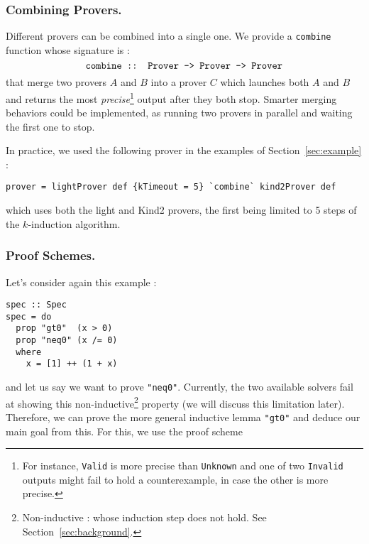 %


\subsubsection{Combining Provers.}\label{combining-provers}
Different provers can be combined into a single one. We provide a \texttt{combine} function whose signature is : $$\texttt{combine :: Prover -\textgreater{} Prover -\textgreater{} Prover}$$ that merge two provers $A$ and $B$ into a prover $C$ which
launches both $A$ and $B$ and returns the most \emph{precise}\footnote{For instance, \texttt{Valid} is more {precise} than \texttt{Unknown} and one of two \texttt{Invalid} outputs might fail to hold a counterexample, in case the other is more precise.} output after they both stop. Smarter merging behaviors could be implemented, as running two provers in parallel and waiting the first one to stop.

In practice, we used the following prover in the examples of Section~\ref{sec:example} :
\begin{lstlisting}[frame=single]
prover = lightProver def {kTimeout = 5} `combine` kind2Prover def
\end{lstlisting}
which uses both the light and Kind2 provers, the first being limited to 5 steps of the $k$-induction algorithm.

\subsubsection{Proof Schemes.}\label{proof-schemes}

Let's consider again this example :

\begin{lstlisting}[frame=single]
spec :: Spec
spec = do
  prop "gt0"  (x > 0)
  prop "neq0" (x /= 0)
  where
    x = [1] ++ (1 + x)

\end{lstlisting}
and let us say we want to prove \texttt{"neq0"}. Currently, the two
available solvers fail at showing this non-inductive\footnote{Non-inductive : whose induction step does not hold. See Section~\ref{sec:background}.} property (we will
discuss this limitation later). Therefore, we can prove the more general
inductive lemma \texttt{"gt0"} and deduce our main goal from this. For
this, we use the proof scheme

